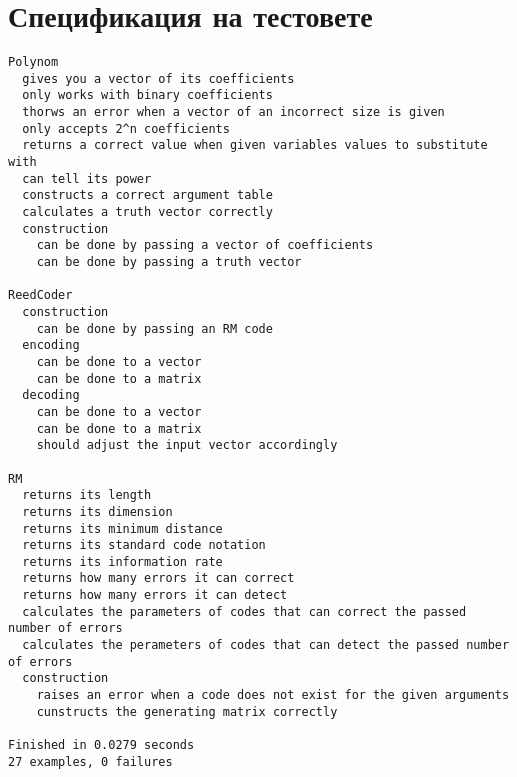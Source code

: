 \documentclass[a4paper,notitlepage,oneside]{report}
\begin{document}
\section*{Спецификация на тестовете}
\begin{lstlisting}
Polynom
  gives you a vector of its coefficients
  only works with binary coefficients
  thorws an error when a vector of an incorrect size is given
  only accepts 2^n coefficients
  returns a correct value when given variables values to substitute with
  can tell its power
  constructs a correct argument table
  calculates a truth vector correctly
  construction
    can be done by passing a vector of coefficients
    can be done by passing a truth vector

ReedCoder
  construction
    can be done by passing an RM code
  encoding
    can be done to a vector
    can be done to a matrix
  decoding
    can be done to a vector
    can be done to a matrix
    should adjust the input vector accordingly

RM
  returns its length
  returns its dimension
  returns its minimum distance
  returns its standard code notation
  returns its information rate
  returns how many errors it can correct
  returns how many errors it can detect
  calculates the parameters of codes that can correct the passed number of errors
  calculates the perameters of codes that can detect the passed number of errors
  construction
    raises an error when a code does not exist for the given arguments
    cunstructs the generating matrix correctly

Finished in 0.0279 seconds
27 examples, 0 failures

\end{lstlisting}
\end{document}
